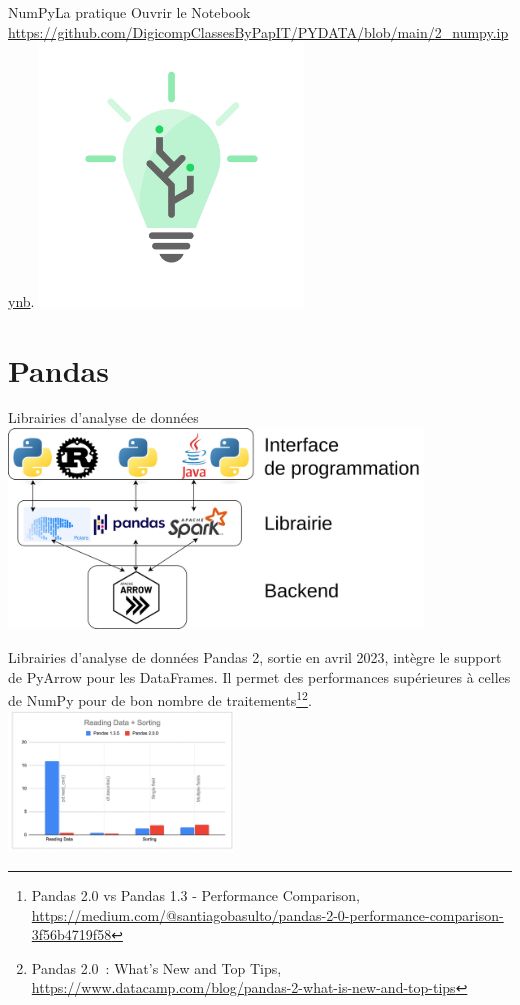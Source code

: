 \documentclass{beamer}
\begin{document}
    \begin{frame}{NumPy}{La pratique}
        Ouvrir le Notebook \url{https://github.com/DigicompClassesByPapIT/PYDATA/blob/main/2_numpy.ipynb}.
        \bigbreak
        \centering
        \includegraphics[width=7cm]{image/digicomp-lightbulb}
    \end{frame}


    \section{Pandas}

    \begin{frame}{Librairies d'analyse de données}
        \centering
        \includegraphics[width=11cm]{image/from-backend-to-language}
    \end{frame}

    \begin{frame}{Librairies d'analyse de données}
        Pandas 2, sortie en avril 2023, intègre le support de PyArrow pour les DataFrames.
        Il permet des performances supérieures à celles de NumPy pour de bon nombre de traitements\footnote{Pandas 2.0 vs Pandas 1.3 - Performance Comparison, \url{https://medium.com/@santiagobasulto/pandas-2-0-performance-comparison-3f56b4719f58}}\footnotestep{}\footnote{\label{datacamp-pandas2}Pandas 2.0~: What’s New and Top Tips, \url{https://www.datacamp.com/blog/pandas-2-what-is-new-and-top-tips}}.
        \bigbreak
        \centering
        \includegraphics[width=6cm]{image/pandas-1-vs-2}
    \end{frame}
\end{document}
